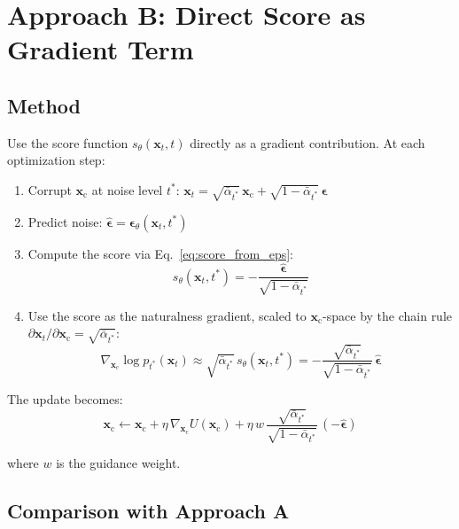 \documentclass[11pt]{article}
\newcommand{\xb}{\mathbf{x}}
\newcommand{\xc}{\xb_{\mathrm{c}}}  %
\newcommand{\eb}{\boldsymbol{\epsilon}}
\newcommand{\alphabar}{\bar{\alpha}}
\begin{document}
\section{Approach B: Direct Score as Gradient Term}

\subsection{Method}

Use the score function $s_\theta(\xb_t, t)$ directly as a gradient contribution.
At each optimization step:
\begin{enumerate}[nosep]
    \item Corrupt $\xc$ at noise level $t^*$:
    $\xb_t = \sqrt{\alphabar_{t^*}}\, \xc + \sqrt{1 - \alphabar_{t^*}}\, \eb$
    \item Predict noise: $\hat{\eb} = \eb_\theta(\xb_t, t^*)$
    \item Compute the score via Eq.~\eqref{eq:score_from_eps}:
    \begin{equation}
        s_\theta(\xb_t, t^*) = -\frac{\hat{\eb}}{\sqrt{1-\alphabar_{t^*}}}
    \end{equation}
    \item Use the score as the naturalness gradient, scaled to $\xc$-space by the
    chain rule $\partial \xb_t / \partial \xc = \sqrt{\alphabar_{t^*}}$:
    \begin{equation}
        \nabla_{\xc} \log p_{t^*}(\xb_t) \approx \sqrt{\alphabar_{t^*}}\, s_\theta(\xb_t, t^*)
        = -\frac{\sqrt{\alphabar_{t^*}}}{\sqrt{1-\alphabar_{t^*}}}\, \hat{\eb}
    \end{equation}
\end{enumerate}

The update becomes:
\begin{equation}
    \xc \leftarrow \xc + \eta\,\nabla_{\xc} U(\xc)
    + \eta\, w \,\frac{\sqrt{\alphabar_{t^*}}}{\sqrt{1-\alphabar_{t^*}}}\,
    (-\hat{\eb})
    \label{eq:update_score}
\end{equation}

where $w$ is the guidance weight.

\subsection{Comparison with Approach A}
\end{document}
